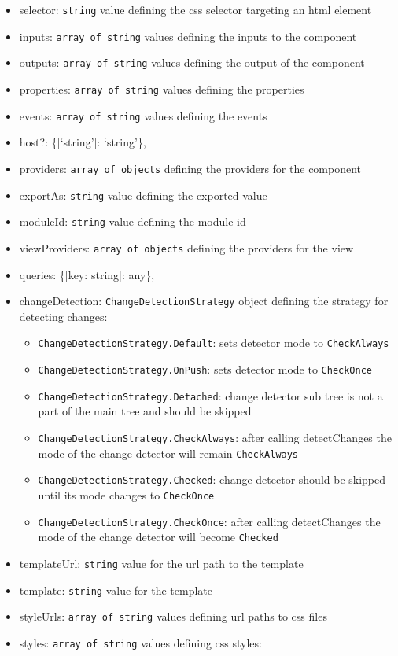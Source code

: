 \documentclass[12pt,]{article}
\providecommand{\tightlist}{%
  \setlength{\itemsep}{0pt}\setlength{\parskip}{0pt}}
\begin{document}
\begin{itemize}
\item
  selector: \texttt{string} value defining the css selector targeting an
  html element
\item
  inputs: \texttt{array\ of\ string} values defining the inputs to the
  component
\item
  outputs: \texttt{array\ of\ string} values defining the output of the
  component
\item
  properties: \texttt{array\ of\ string} values defining the properties
\item
  events: \texttt{array\ of\ string} values defining the events
\item
  host?: \{{[}`string'{]}: `string'\},
\item
  providers: \texttt{array\ of\ objects} defining the providers for the
  component
\item
  exportAs: \texttt{string} value defining the exported value
\item
  moduleId: \texttt{string} value defining the module id
\item
  viewProviders: \texttt{array\ of\ objects} defining the providers for
  the view
\item
  queries: \{{[}key: string{]}: any\},
\item
  changeDetection: \texttt{ChangeDetectionStrategy} object defining the
  strategy for detecting changes:

  \begin{itemize}
  \tightlist
  \item
    \texttt{ChangeDetectionStrategy.Default}: sets detector mode to
    \texttt{CheckAlways}
  \item
    \texttt{ChangeDetectionStrategy.OnPush}: sets detector mode to
    \texttt{CheckOnce}
  \item
    \texttt{ChangeDetectionStrategy.Detached}: change detector sub tree
    is not a part of the main tree and should be skipped
  \item
    \texttt{ChangeDetectionStrategy.CheckAlways}: after calling
    detectChanges the mode of the change detector will remain
    \texttt{CheckAlways}
  \item
    \texttt{ChangeDetectionStrategy.Checked}: change detector should be
    skipped until its mode changes to \texttt{CheckOnce}
  \item
    \texttt{ChangeDetectionStrategy.CheckOnce}: after calling
    detectChanges the mode of the change detector will become
    \texttt{Checked}
  \end{itemize}
\item
  templateUrl: \texttt{string} value for the url path to the template
\item
  template: \texttt{string} value for the template
\item
  styleUrls: \texttt{array\ of\ string} values defining url paths to css
  files
\item
  styles: \texttt{array\ of\ string} values defining css styles:


\end{itemize}
\end{document}
